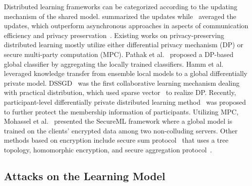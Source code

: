 \documentclass[10pt, conference, letterpaper]{IEEEtran}
\begin{document}
Distributed learning frameworks can be categorized according to the updating mechanism of the shared model. \cite{shokri2015privacy} summarized the updates while~\cite{mcmahan2016communication,konevcny2016federated}
averaged the updates, which outperform asynchronous approaches in aspects of communication efficiency and privacy preservation~\cite{chen2016revisiting}. Existing works on privacy-preserving distributed learning mostly utilize either differential privacy mechanism (DP) or secure multi-party computation (MPC).
Pathak et al.~\cite{pathak2010multiparty} proposed a DP-based global classifier by aggregating the locally trained classifiers. Hamm et al.~\cite{hamm2016learning} leveraged knowledge transfer from ensemble local models to a global differentially private model. DSSGD~\cite{shokri2015privacy} was the first collaborative learning mechanism dealing with practical distribution, which used sparse vector~\cite{dwork2014algorithmic} to realize DP.
Recently, participant-level differentially private distributed learning method~\cite{geyer2017differentially}
was proposed to further protect the membership information of participants.
Utilizing MPC, Mohassel et al.~\cite{mohassel2017secureml} presented the SecureML framework where a global model is trained on the clients' encrypted data among two non-colluding servers. Other methods based on encryption include secure sum protocol~\cite{danner2015fully} that uses a tree topology, homomorphic encryption, and secure aggregation protocol~\cite{bonawitz2017practical}.

\subsection{Attacks on the Learning Model}
\label{subsec:relate_attack}
\end{document}

